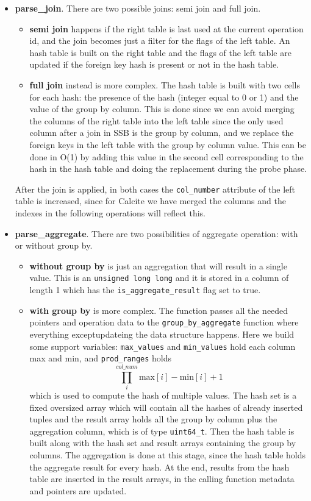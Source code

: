 \documentclass[a4paper, 10pt]{article}
\begin{document}
\begin{itemize}
    \item \textbf{parse\_join}. There are two possible joins: semi join and full join.
          \begin{itemize}
              \item \textbf{semi join} happens if the right table is last used at the current operation id, and the join becomes just a filter for the flags of the left table. An hash table is built on the right table and the flags of the left table are updated if the foreign key hash is present or not in the hash table.
              \item \textbf{full join} instead is more complex. The hash table is built with two cells for each hash: the presence of the hash (integer equal to 0 or 1) and the value of the group by column. This is done since we can avoid merging the columns of the right table into the left table since the only used column after a join in SSB is the group by column, and we replace the foreign keys in the left table with the group by column value. This can be done in O(1) by adding this value in the second cell corresponding to the hash in the hash table and doing the replacement during the probe phase.
          \end{itemize}
          After the join is applied, in both cases the \texttt{col\_number} attribute of the left table is increased, since for Calcite we have merged the columns and the indexes in the following operations will reflect this.
    \item \textbf{parse\_aggregate}. There are two possibilities of aggregate operation: with or without group by.
          \begin{itemize}
              \item \textbf{without group by} is just an aggregation that will result in a single value. This is an \texttt{unsigned long long} and it is stored in a column of length 1 which has the \texttt{is\_aggregate\_result} flag set to true.
              \item \textbf{with group by} is more complex. The function passes all the needed pointers and operation data to the \texttt{group\_by\_aggregate} function where everything exceptupdateing the data structure happens. Here we build some support variables: \texttt{max\_values} and \texttt{min\_values} hold each column max and min, and \texttt{prod\_ranges} holds \[ \prod^{col\_num}_i \mathrm{max}[i] - \mathrm{min}[i] + 1 \] which is used to compute the hash of multiple values. The hash set is a fixed oversized array which will contain all the hashes of already inserted tuples and the result array holds all the group by column plus the aggregation column, which is of type \texttt{uint64\_t}. Then the hash table is built along with the hash set and result arrays containing the group by columns. The aggregation is done at this stage, since the hash table holds the aggregate result for every hash. At the end, results from the hash table are inserted in the result arrays, in the calling function metadata and pointers are updated.
          \end{itemize}

\end{itemize}
\end{document}
